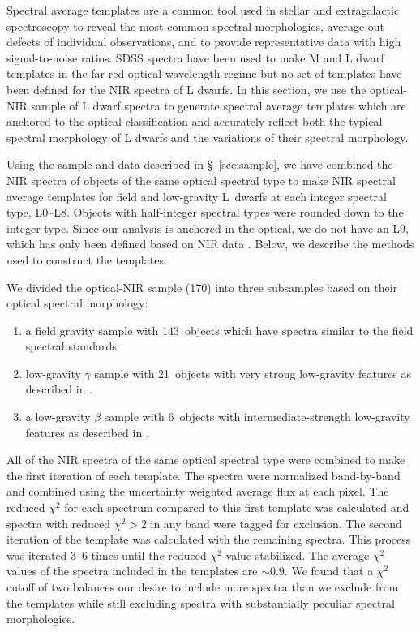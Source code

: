 \documentclass[12pt,preprint]{aastex}
\newcommand{\sample}{170}
\newcommand{\optField}{143}
\newcommand{\optBeta}{6}
\newcommand{\optGamma}{21}
\begin{document}
Spectral average templates are a common tool used in stellar and extragalactic spectroscopy to reveal the most common spectral morphologies, average out defects of individual observations, and to provide representative data with high signal-to-noise ratios.
SDSS spectra have been used to make M and L dwarf templates in the far-red optical wavelength regime \citep{Bochanski07_templates, Schmidt:2014jc} but no set of templates have been defined for the NIR spectra of L dwarfs.
In this section, we use the optical-NIR sample of L dwarf spectra to generate spectral average templates which are anchored to the optical classification and accurately reflect both the typical spectral morphology of L dwarfs and the variations of their spectral morphology.

Using the sample and data described in \S~\ref{sec:sample}, we have combined the NIR spectra of objects of the same optical spectral type to make NIR spectral average templates for field and low-gravity L~dwarfs at each integer spectral type, L0--L8. Objects with half-integer spectral types were rounded down to the integer type.
Since our analysis is anchored in the optical, we do not have an L9, which has only been defined based on NIR data \citep{K99,Geballe02}.
Below, we describe the methods used to construct the templates.

We divided the optical-NIR sample (\sample) into three subsamples based on their optical spectral morphology:
\begin{enumerate} \itemsep1pt \parskip0pt 
	\item a field gravity sample with \optField~objects which have spectra similar to the \citet{K99} field spectral standards.
	\item low-gravity $\gamma$ sample with \optGamma~objects with very strong low-gravity features as described in \citet{Cruz09_lowg}.
	\item a low-gravity $\beta$ sample with \optBeta~objects with intermediate-strength low-gravity features as described in \citet{Cruz09_lowg}.
\end{enumerate}

All of the NIR spectra of the same optical spectral type were combined to make the first iteration of each template.
The spectra were normalized band-by-band and combined using the uncertainty weighted average flux at each pixel.
The reduced $\chi^2$ for each spectrum compared to this first template was calculated and spectra with reduced $\chi^2 > 2$ in any band were tagged for exclusion.
The second iteration of the template was calculated with the remaining spectra.
This process was iterated 3--6 times until the reduced $\chi^2$ value stabilized.
The average $\chi^2$ values of the spectra included in the templates are $\sim0.9$.
We found that a $\chi^2$ cutoff of two balances our desire to include more spectra than we exclude from the templates while still excluding spectra with substantially peculiar spectral morphologies.
\end{document}
